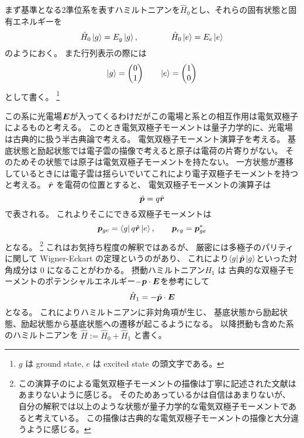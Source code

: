 \documentclass[11pt,dvipdfmx,a4paper]{jsarticle}
\begin{document}
まず基準となる2準位系を表すハミルトニアンを\(\hat{H}_0\)とし、それらの固有状態と固有エネルギーを
\begin{equation}
	\hat{H}_0 \ket{g} = E_g \ket{g}, \qquad \qquad \hat{H}_0 \ket{e} = E_e \ket{e}
\end{equation}
のようにおく。
また行列表示の際には
\begin{equation}
	\ket{g} =
	\begin{pmatrix}
		0\\
		1
	\end{pmatrix}
	\qquad
	\ket{e} =
	\begin{pmatrix}
		1 \\
		0
	\end{pmatrix}
\end{equation}
として書く。
\footnote{\(g\) は ground state, \(e\) は excited state の頭文字である。}

この系に光電場\(\vb*{E}\)が入ってくるわけだがこの電場と系との相互作用は電気双極子によるものと考える。
このとき電気双極子モーメントは量子力学的に、光電場は古典的に扱う半古典論で考える。
電気双極子モーメント演算子を考える。
基底状態と励起状態では電子雲の描像で考えると原子は電荷の片寄りがない。
そのためその状態では原子は電気双極子モーメントを持たない。
一方状態が遷移しているときには電子雲は揺らいでいてこれにより電子双極子モーメントを持つと考える。
\(\hat{\vb*{r}}\) を電荷の位置とすると、
電気双極子モーメントの演算子は
\begin{equation}
	\hat{\vb*{p}} = q \hat{\vb*{r}}
\end{equation}
で表される。
これよりそこにできる双極子モーメントは
\begin{equation}
	\vb*{p}_{ge} = \bra{g}q\hat{\vb*{r}}\ket{e},\qquad \vb*{p}_{eg} = \vb*{p}_{ge}^{*}
\end{equation}
となる。
\footnote{この演算子のによる電気双極子モーメントの描像は丁寧に記述された文献はあまりないように感じる。
そのためあっているかは自信はあまりないが、
自分の解釈では以上のような状態が量子力学的な電気双極子モーメントであると考えている。
この描像は古典的な電気双極子モーメントの描像と大分違うように感じる。}
これはお気持ち程度の解釈ではあるが、
厳密には多極子のパリティに関して Wigner-Eckart の定理というのがあり、
これにより\(\bra{g}\hat{\vb*{p}}\ket{g}\)といった対角成分は \(0\) になることがわかる。
摂動ハミルトニアン\(H_1\) は
古典的な双極子モーメントのポテンシャルエネルギー\(-\vb*{p}\cdot\vb*{E}\)を参考にして
\begin{equation}
	\hat{H}_1 = - \hat{\vb*{p}}\cdot\vb*{E}
\end{equation}
となる。
これによりハミルトニアンに非対角項が生じ、
基底状態から励起状態、励起状態から基底状態への遷移が起こるようになる。
以降摂動も含めた系のハミルトニアンを \(\hat{H} := \hat{H}_0 + \hat{H}_1\) と書く。
\end{document}
